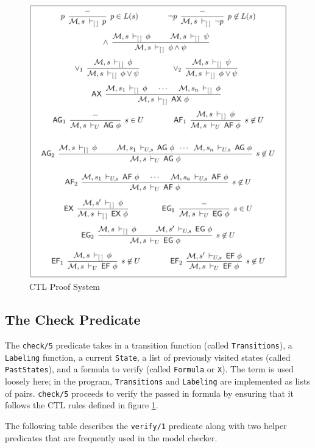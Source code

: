 \documentclass[a4paper, 11pt]{article}
\begin{document}
   \begin{figure}[H]
      \centering
      \includegraphics[scale=0.30]{ctl-proof-system}
      \caption{CTL Proof System}
      \label{ctl-proof-system}
   \end{figure}
   \bigbreak


   \subsection{The Check Predicate}
   The \texttt{check/5} predicate takes in a
   transition function (called \texttt{Transitions}), 
   a \texttt{Labeling} function, a current 
   \texttt{State}, a list of previously visited states 
   (called \texttt{PastStates}), and a formula to verify
   (called \texttt{Formula} or \texttt{X}). 
   The term  is used loosely here; in
   the program, \texttt{Transitions} and \texttt{Labeling}
   are implemented as lists of pairs. \texttt{check/5}
   proceeds to verify the passed in formula by ensuring that
   it follows the CTL rules defined in figure
   \ref{ctl-proof-system}.
   \bigbreak

   The following table describes the \texttt{verify/1}
   predicate along with two helper predicates that are
   frequently used in the model checker.
\end{document}
